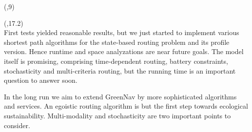 \begin{textblock}{\mycolwidth}(\rightpos,9)
 \\
\begin{center}
\end{center}
\end{textblock}

\begin{textblock}{\mycolwidth}(\rightpos,17.2)
 \\
First tests yielded reasonable results, but we just started to implement
various shortest path algorithms for the state-based routing problem and
its profile version. Hence runtime and space analyzations are near future
goals. The model itself is promising, comprising time-dependent routing,
battery constraints, stochasticity and multi-criteria routing, but the
running time is an important question to answer soon.

In the long run we aim to extend GreenNav by more sophisticated algorithms
and services. An egoistic routing algorithm is but the first step towards
ecological sustainability. Multi-modality and stochasticity are two important
points to consider.
\end{textblock}
